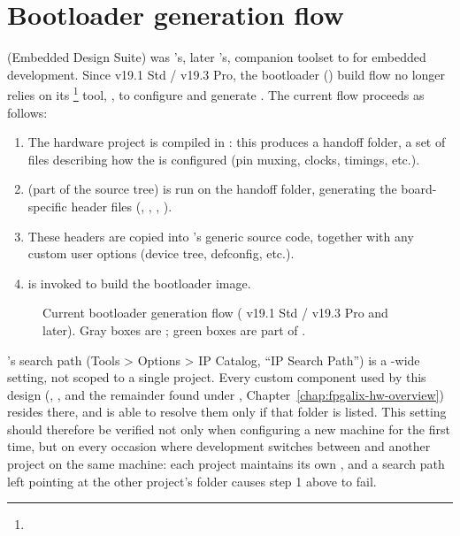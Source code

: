 \section{Bootloader generation flow}
\label{sec:fpgalix-bootloader-flow}

 (Embedded Design Suite) was 's, later 's, companion toolset to  for   embedded development. Since  v19.1 Std / v19.3 Pro, the bootloader () build flow no longer relies on its \footnote{} tool, , to configure and generate . The current flow proceeds as follows:

\begin{enumerate}
    \item The hardware project is compiled in : this produces a handoff folder, a set of  files describing how the  is configured (pin muxing, clocks,  timings, etc.).
    \item {} \cite{MACNICA-BOOT} (part of the  source tree) is run on the handoff folder, generating the board-specific header files (, , , ).
    \item These headers are copied into 's generic source code, together with any custom user options (device tree, defconfig, etc.).
    \item {} is invoked to build the bootloader image.
\end{enumerate}

\begin{figure}[htbp]
    \centering
    
    \caption{Current bootloader generation flow ( v19.1 Std / v19.3 Pro and later). Gray boxes are ; green boxes are part of .}
    \label{fig:fpgalix-boot-generation-flow}
\end{figure}

\begin{warningbox}
    's  search path (Tools > Options > IP Catalog, ``IP Search Path'') is a -wide setting, not scoped to a single project. Every custom component used by this design (, , and the remainder found under , Chapter~\ref{chap:fpgalix-hw-overview}) resides there, and  is able to resolve them only if that folder is listed. This setting should therefore be verified not only when configuring a new machine for the first time, but on every occasion where development switches between  and another  project on the same machine: each project maintains its own , and a search path left pointing at the other project's folder causes step 1 above to fail.
\end{warningbox}


